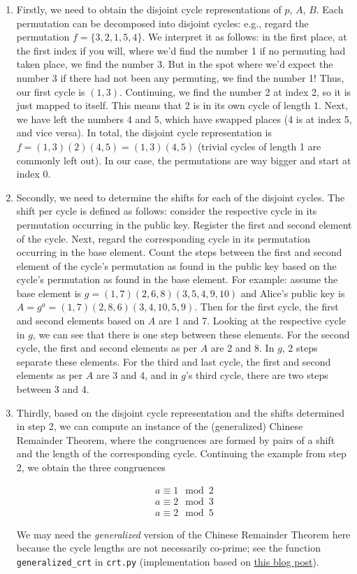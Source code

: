 \documentclass{article}
\begin{document}
\begin{enumerate}
    \item Firstly, we need to obtain the disjoint cycle representations of $p$, $A$, $B$. Each permutation can be decomposed into disjoint cycles: e.g., regard the permutation $f = \{3, 2, 1, 5, 4\}$. We interpret it as follows: in the first place, at the first index if you will, where we'd find the number 1 if no permuting had taken place, we find the number 3. But in the spot where we'd expect the number 3 if there had not been any permuting, we find the number 1! Thus, our first cycle is $(1, 3)$. Continuing, we find the number 2 at index 2, so it is just mapped to itself. This means that 2 is in its own cycle of length 1. Next, we have left the numbers 4 and 5, which have swapped places (4 is at index 5, and vice versa). In total, the disjoint cycle representation is $f = (1,3)(2)(4,5) = (1,3)(4,5)$ (trivial cycles of length 1 are commonly left out). In our case, the permutations are way bigger and start at index 0.
    \item Secondly, we need to determine the shifts for each of the disjoint cycles. The shift per cycle is defined as follows: consider the respective cycle in its permutation occurring in the public key. Register the first and second element of the cycle. Next, regard the corresponding cycle in its permutation occurring in the base element. Count the steps between the first and second element of the cycle's permutation as found in the public key based on the cycle's permutation as found in the base element. For example: assume the base element is $g = (1,7)(2,6,8)(3,5,4,9,10)$ and Alice's public key is $A = g^a = (1,7)(2,8,6)(3,4,10,5,9)$. Then for the first cycle, the first and second elements based on $A$ are 1 and 7. Looking at the respective cycle in $g$, we can see that there is one step between these elements. For the second cycle, the first and second elements as per $A$ are 2 and 8. In $g$, 2 steps separate these elements. For the third and last cycle, the first and second elements as per $A$ are 3 and 4, and in $g$'s third cycle, there are two steps between 3 and 4.
    \item Thirdly, based on the disjoint cycle representation and the shifts determined in step 2, we can compute an instance of the (generalized) Chinese Remainder Theorem, where the congruences are formed by pairs of a shift and the length of the corresponding cycle. Continuing the example from step 2, we obtain the three congruences
    
    \begin{align*}
        a \equiv 1 \mod 2 \\
        a \equiv 2 \mod 3 \\
        a \equiv 2 \mod 5
    \end{align*}

    We may need the \emph{generalized} version of the Chinese Remainder Theorem here because the cycle lengths are not necessarily co-prime; see the function \texttt{generalized\_crt} in \texttt{crt.py} (implementation based on \href{https://forthright48.com/chinese-remainder-theorem-part-2-non-coprime-moduli/}{this blog post}).

\end{enumerate}
\end{document}
